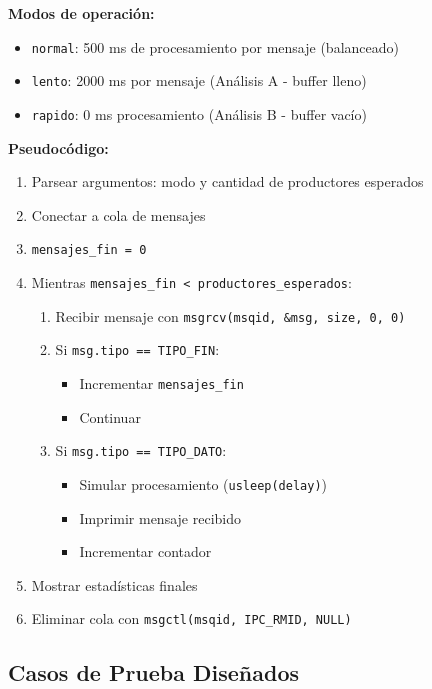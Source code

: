 \documentclass[10pt]{article}
\begin{document}
\textbf{Modos de operación:}
\begin{itemize}
  \item \texttt{normal}: 500 ms de procesamiento por mensaje (balanceado)
  \item \texttt{lento}: 2000 ms por mensaje (Análisis A - buffer lleno)
  \item \texttt{rapido}: 0 ms procesamiento (Análisis B - buffer vacío)
\end{itemize}

\textbf{Pseudocódigo:}
\begin{enumerate}
  \item Parsear argumentos: modo y cantidad de productores esperados
  \item Conectar a cola de mensajes
  \item \texttt{mensajes\_fin = 0}
  \item Mientras \texttt{mensajes\_fin < productores\_esperados}:
  \begin{enumerate}
    \item Recibir mensaje con \texttt{msgrcv(msqid, \&msg, size, 0, 0)}
    \item Si \texttt{msg.tipo == TIPO\_FIN}:
    \begin{itemize}
      \item Incrementar \texttt{mensajes\_fin}
      \item Continuar
    \end{itemize}
    \item Si \texttt{msg.tipo == TIPO\_DATO}:
    \begin{itemize}
      \item Simular procesamiento (\texttt{usleep(delay)})
      \item Imprimir mensaje recibido
      \item Incrementar contador
    \end{itemize}
  \end{enumerate}
  \item Mostrar estadísticas finales
  \item Eliminar cola con \texttt{msgctl(msqid, IPC\_RMID, NULL)}
\end{enumerate}

\subsection{Casos de Prueba Diseñados}
\end{document}
